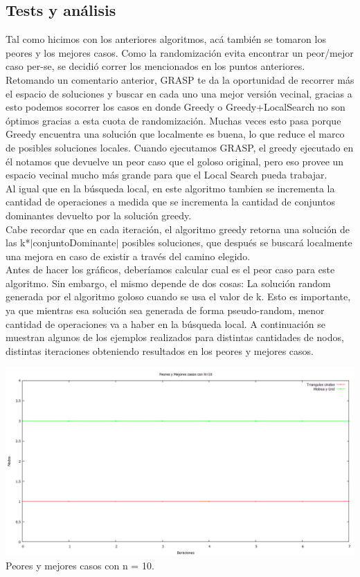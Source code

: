 \subsection{Tests y análisis}
Tal como hicimos con los anteriores algoritmos, acá también se tomaron los peores y los mejores casos. Como la randomización evita encontrar un peor/mejor caso per-se, se 
decidió correr los mencionados
en los puntos anteriores. Retomando un comentario anterior, GRASP te da la oportunidad de recorrer más el espacio de soluciones y buscar en cada uno una mejor versión vecinal, 
gracias a esto podemos socorrer los 
casos en donde Greedy o Greedy+LocalSearch no son óptimos gracias a esta cuota de randomización. Muchas veces esto pasa porque Greedy encuentra una solución que localmente es 
buena, lo que reduce el marco 
de posibles soluciones locales. Cuando ejecutamos GRASP, el greedy ejecutado en él notamos que devuelve un peor caso que el goloso original, pero eso provee un espacio vecinal 
mucho más grande para que el Local
Search pueda trabajar. \\
Al igual que en la búsqueda local, en este algoritmo tambien se incrementa la cantidad de operaciones a medida
que se incrementa la cantidad de conjuntos dominantes devuelto por la solución greedy.\\
Cabe recordar que en cada iteración, el algoritmo greedy retorna una solución de las k*$|$conjuntoDominante$|$ posibles soluciones, que después se buscará localmente una mejora 
en caso de existir a través del camino elegido.\\
Antes de hacer los gráficos, deberíamos calcular cual es el peor caso para este algoritmo. Sin embargo, el mismo depende de dos cosas:
La solución random generada por el algoritmo goloso cuando se usa el valor de k. Esto es importante, ya que mientras esa solución sea generada de forma pseudo-random, menor cantidad
de operaciones va a haber en la búsqueda local.
A continuación se muestran algunos de los ejemplos realizados para distintas cantidades de nodos, distintas iteraciones obteniendo resultados en los peores y mejores casos.


\begin{center}
\includegraphics[width=17cm]{./graficos/grasp/peoresymejoresn10.png}\\
Peores y mejores casos con n = 10.
\end{center}


